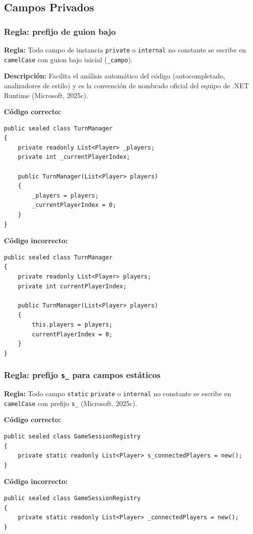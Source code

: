 \subsection{Campos Privados}

\subsubsection{Regla: prefijo de guion bajo}

\textbf{Regla:} Todo campo de instancia \texttt{private} o \texttt{internal} no constante se escribe en \texttt{camelCase} con guion bajo inicial (\texttt{\_campo}).

\textbf{Descripción:} Facilita el análisis automático del código (autocompletado, analizadores de estilo) y es la convención de nombrado oficial del equipo de .NET Runtime (Microsoft, 2025c).

\textbf{Código correcto:}
\begin{lstlisting}[style=csharpstyle]
public sealed class TurnManager
{
    private readonly List<Player> _players;
    private int _currentPlayerIndex;

    public TurnManager(List<Player> players)
    {
        _players = players;
        _currentPlayerIndex = 0;
    }
}
\end{lstlisting}

\textbf{Código incorrecto:}
\begin{lstlisting}[style=csharpstyle]
public sealed class TurnManager
{
    private readonly List<Player> players;
    private int currentPlayerIndex;

    public TurnManager(List<Player> players)
    {
        this.players = players;
        currentPlayerIndex = 0;
    }
}
\end{lstlisting}

\subsubsection{Regla: prefijo \texttt{s\_} para campos estáticos}

\textbf{Regla:} Todo campo \texttt{static} \texttt{private} o \texttt{internal} no constante se escribe en \texttt{camelCase} con prefijo \texttt{s\_} (Microsoft, 2025c).

\textbf{Código correcto:}
\begin{lstlisting}[style=csharpstyle]
public sealed class GameSessionRegistry
{
    private static readonly List<Player> s_connectedPlayers = new();
}
\end{lstlisting}

\textbf{Código incorrecto:}
\begin{lstlisting}[style=csharpstyle]
public sealed class GameSessionRegistry
{
    private static readonly List<Player> _connectedPlayers = new();
}
\end{lstlisting}
